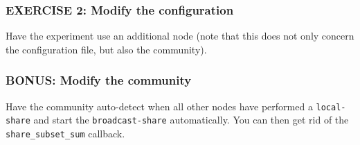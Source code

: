 \documentclass{article}
\begin{document}
\subsubsection{EXERCISE 2: Modify the configuration}
Have the experiment use an additional node (note that this does not only concern the configuration file, but also the community).

\subsubsection{BONUS: Modify the community}
Have the community auto-detect when all other nodes have performed a \texttt{local-share} and start the \texttt{broadcast-share} automatically.
You can then get rid of the \texttt{share\_subset\_sum} callback.


{\small }
\end{document}
